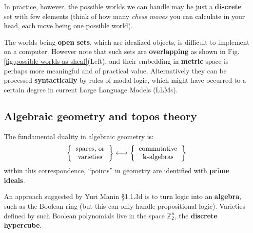 \documentclass[runningheads]{llncs}
\begin{document}
In practice, however, the possible worlds we can handle may be just a \textbf{discrete} set with few elements (think of how many \textit{chess moves} you can calculate in your head, each move being one possible world).  %

The worlds being \textbf{open sets}, which are idealized objects, is difficult to implement on a computer.  However note that such sets are \textbf{overlapping} as shown in Fig.\ref{fig:possible-worlds-as-sheaf}(Left), and their embedding in \textbf{metric} space is perhaps more meaningful and of practical value.  Alternatively they can be processed \textbf{syntactically} by rules of modal logic, which might have occurred to a certain degree in current Large Language Models (LLMs).

\subsection{Algebraic geometry and topos theory}

The fundamental duality in algebraic geometry is:
\begin{equation}
\left\{ \begin{tabular}{cc} spaces, or \\ varieties \end{tabular} \right\} \longleftrightarrow \left\{ \begin{tabular}{cc} commutative \\ $\mathbf{k}$-algebras \end{tabular} \right\}
\end{equation}
within this correspondence, ``points'' in geometry are identified with \textbf{prime ideals}.

An approach suggested by Yuri Manin \cite{Manin2009} \cite{Manin2018} \S1.1.3d is to turn logic into an \textbf{algebra}, such as the Boolean ring (but this can only handle propositional logic).  Varieties defined by such Boolean polynomials \cite{Lundqvist2015} live in the space $\mathbb{Z}_2^n$, the \textbf{discrete hypercube}.  
\end{document}
